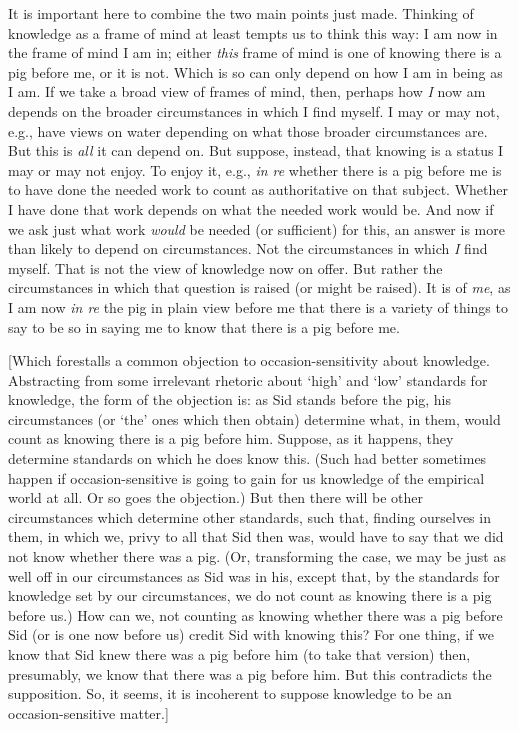 It is important here to combine the two main points just made. Thinking of knowledge as a frame of mind at least tempts us to think this way: I am now in the frame of mind I am in; either \emph{this} frame of mind is one of knowing there is a pig before me, or it is not. Which is so can only depend on how I am in being as I am. If we take a broad view of frames of mind, then, perhaps how \emph{I} now am depends on the broader circumstances in which I find myself. I may or may not, e.g., have views on water depending on what those broader circumstances are. But this is \emph{all} it can depend on. But suppose, instead, that knowing is a status I may or may not enjoy. To enjoy it, e.g., \emph{in re} whether there is a pig before me is to have done the needed work to count as authoritative on that subject. Whether I have done that work depends on what the needed work would be. And now if we ask just what work \emph{would} be needed (or sufficient) for this, an answer is more than likely to depend on circumstances. Not the circumstances in which \emph{I} find myself. That is not the view of knowledge now on offer. But rather the circumstances in which that question is raised (or might be raised). It is of \emph{me}, as I am now \emph{in re} the pig in plain view before me that there is a variety of things to say to be so in saying me to know that there is a pig before me.

[Which forestalls a common objection to occasion-sensitivity about knowledge. Abstracting from some irrelevant rhetoric about `high' and `low' standards for knowledge, the form of the objection is: as Sid stands before the pig, his circumstances (or `the' ones which then obtain) determine what, in them, would count as knowing there is a pig before him. Suppose, as it happens, they determine standards on which he does know this. (Such had better sometimes happen if occasion-sensitive is going to gain for us knowledge of the empirical world at all. Or so goes the objection.) But then there will be other circumstances which determine other standards, such that, finding ourselves in them, in which we, privy to all that Sid then was, would have to say that we did not know whether there was a pig. (Or, transforming the case, we may be just as well off in our circumstances as Sid was in his, except that, by the standards for knowledge set by our circumstances, we do not count as knowing there is a pig before us.) How can we, not counting as knowing whether there was a pig before Sid (or is one now before us) credit Sid with knowing this? For one thing, if we know that Sid knew there was a pig before him (to take that version) then, presumably, we know that there was a pig before him. But this contradicts the supposition. So, it seems, it is incoherent to suppose knowledge to be an occasion-sensitive matter.]

